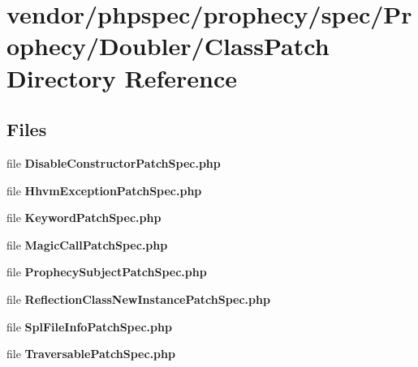 \section{vendor/phpspec/prophecy/spec/\+Prophecy/\+Doubler/\+Class\+Patch Directory Reference}
\label{dir_e3374670fffda3a5800309c332b5edb0}
\subsection*{Files}
\begin{DoxyCompactItemize}
\item 
file {\bf Disable\+Constructor\+Patch\+Spec.\+php}
\item 
file {\bf Hhvm\+Exception\+Patch\+Spec.\+php}
\item 
file {\bf Keyword\+Patch\+Spec.\+php}
\item 
file {\bf Magic\+Call\+Patch\+Spec.\+php}
\item 
file {\bf Prophecy\+Subject\+Patch\+Spec.\+php}
\item 
file {\bf Reflection\+Class\+New\+Instance\+Patch\+Spec.\+php}
\item 
file {\bf Spl\+File\+Info\+Patch\+Spec.\+php}
\item 
file {\bf Traversable\+Patch\+Spec.\+php}
\end{DoxyCompactItemize}
